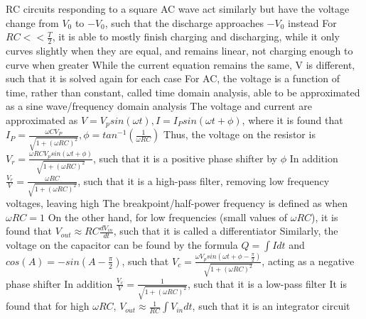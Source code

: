 \documentclass[11 pt, twoside]{article}
\newenvironment{outline*}
{
	\begin{outline}[enumerate]
	}
	{\end{outline}
}
\begin{document}
\begin{outline*}
	\2 RC circuits responding to a square AC wave act similarly but have the voltage change from $V_0$ to $-V_0$, such that the discharge approaches $-V_0$ instead
		\3 For $RC << \frac{T}{2}$, it is able to mostly finish charging and discharging, while it only curves slightly when they are equal, and remains linear, not charging enough to curve when greater
		\3 While the current equation remains the same, V is different, such that it is solved again for each case
	\2 For AC, the voltage is a function of time, rather than constant, called time domain analysis, able to be approximated as a sine wave/frequency domain analysis
		\3 The voltage and current are approximated as $V = V_p sin(\omega t), I = I_P sin(\omega t + \phi)$, where it is found that $I_P = \frac{\omega CV_P}{\sqrt{1 + (\omega RC)^2}}, \phi = tan^{-1}(\frac{1}{\omega RC})$
		\3 Thus, the voltage on the resistor is $V_r = \frac{\omega RCV_psin(\omega t + \phi)}{\sqrt{1 + (\omega RC)^2}}$, such that it is a positive phase shifter by $\phi$
			\4 In addition $\frac{V_r}{V} = \frac{\omega RC}{\sqrt{1 + (\omega RC)^2}}$, such that it is a high-pass filter, removing low frequency voltages, leaving high
			\4 The breakpoint/half-power frequency is defined as when $\omega RC = 1$
			\4 On the other hand, for low frequencies (small values of $\omega RC$), it is found that $V_{out} \approx RC\frac{dV_{in}}{dt}$, such that it is called a differentiator
		\3 Similarly, the voltage on the capacitor can be found by the formula $Q = \int Idt$ and $cos(A) = -sin(A - \frac{\pi}{2})$, such that $V_c = \frac{\omega V_psin(\omega t + \phi - \frac{\pi}{2})}{\sqrt{1 + (\omega RC)^2}}$, acting as a negative phase shifter
			\4 In addition $\frac{V_c}{V} = \frac{1}{\sqrt{1 + (\omega RC)^2}}$, such that it is a low-pass filter
			\4 It is found that for high $\omega RC$, $V_{out} \approx \frac{1}{RC}\int V_{in}dt$, such that it is an integrator circuit
\end{outline*}
\end{document}
